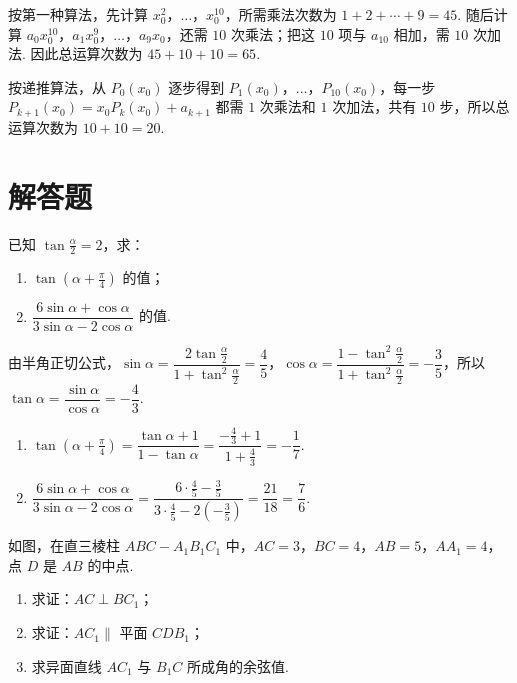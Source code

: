 \begin{solution}
按第一种算法，先计算 \(x_0^2\)，\(\ldots\)，\(x_0^{10}\)，所需乘法次数为 \(1+2+\cdots+9=45\). 随后计算 \(a_0x_0^{10}\)，\(a_1x_0^9\)，\(\ldots\)，\(a_9x_0\)，还需 \(10\) 次乘法；把这 \(10\) 项与 \(a_{10}\) 相加，需 \(10\) 次加法. 因此总运算次数为 \(45+10+10=65\).

按递推算法，从 \(P_0(x_0)\) 逐步得到 \(P_1(x_0)\)，\(\ldots\)，\(P_{10}(x_0)\)，每一步 \(P_{k+1}(x_0)=x_0P_k(x_0)+a_{k+1}\) 都需 \(1\) 次乘法和 \(1\) 次加法，共有 \(10\) 步，所以总运算次数为 \(10+10=20\).
\end{solution}

\section{解答题}
\begin{problem}
已知 \(\tan\frac{\alpha}{2}=2\)，求：

\begin{enumerate}
\item \(\tan\left(\alpha+\frac{\pi}{4}\right)\) 的值；
\item \(\dfrac{6\sin\alpha+\cos\alpha}{3\sin\alpha-2\cos\alpha}\) 的值.
\end{enumerate}
\end{problem}

\begin{solution}
由半角正切公式，\(\sin\alpha=\dfrac{2\tan\frac{\alpha}{2}}{1+\tan^2\frac{\alpha}{2}}=\dfrac45\)，\(\cos\alpha=\dfrac{1-\tan^2\frac{\alpha}{2}}{1+\tan^2\frac{\alpha}{2}}=-\dfrac35\)，所以 \(\tan\alpha=\dfrac{\sin\alpha}{\cos\alpha}=-\dfrac43\).

\begin{enumerate}
\item \(\tan\left(\alpha+\frac{\pi}{4}\right)=\dfrac{\tan\alpha+1}{1-\tan\alpha}=\dfrac{-\frac43+1}{1+\frac43}=-\dfrac17\).
\item \(\dfrac{6\sin\alpha+\cos\alpha}{3\sin\alpha-2\cos\alpha}=\dfrac{6\cdot\frac45-\frac35}{3\cdot\frac45-2\left(-\frac35\right)}=\dfrac{21}{18}=\dfrac76\).
\end{enumerate}
\end{solution}

\begin{problem}
如图，在直三棱柱 \(ABC-A_1B_1C_1\) 中，\(AC=3\)，\(BC=4\)，\(AB=5\)，\(AA_1=4\)，点 \(D\) 是 \(AB\) 的中点.

\begin{enumerate}
\item 求证：\(AC\perp BC_1\)；
\item 求证：\(AC_1\parallel\) 平面 \(CDB_1\)；
\item 求异面直线 \(AC_1\) 与 \(B_1C\) 所成角的余弦值.
\end{enumerate}

\end{problem}

